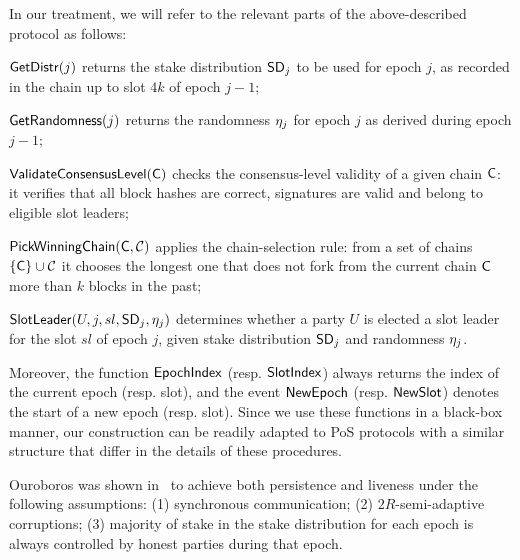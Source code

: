 In our treatment, we will refer to the relevant parts of the above-described protocol as
follows:
\begin{description}
\item
  $\mathsf{GetDistr}(j)$
  returns the stake distribution $\mathsf{SD}_j$ to be used for epoch $j$, as recorded in the
    chain up to slot $4k$ of epoch $j-1$;

\item
  $\mathsf{GetRandomness}(j)$
  returns the randomness $\eta_j$ for epoch $j$ as derived during epoch $j-1$;
\item
  $\mathsf{ValidateConsensusLevel}(\mathsf{C})$
  checks the consensus-level validity of a given chain $\mathsf{C}$: it verifies that all block hashes
    are correct, signatures are valid and belong to eligible slot leaders;
\item
  $\mathsf{PickWinningChain}(\mathsf{C},\mathcal{C})$
    applies the chain-selection rule: from a set of chains $\{\mathsf{C}\}\cup\mathcal{C}$ it
    chooses the longest one that does not fork from the current chain $\mathsf{C}$
    more than $k$ blocks in the past;
\item
  $\mathsf{SlotLeader}(U,j,sl,\mathsf{SD}_j,\eta_{j})$
  determines whether a party $U$ is elected a slot leader for the slot $sl$ of
    epoch $j$, given stake distribution $\mathsf{SD}_j$ and randomness $\eta_{j}$.
\end{description}
Moreover, the function $\mathsf{EpochIndex}$ (resp. $\mathsf{SlotIndex}$) always returns
the index of the current epoch (resp. slot), and the event $\mathsf{NewEpoch}$ (resp.
$\mathsf{NewSlot}$) denotes the start of a new epoch (resp. slot).
Since we use these functions in a black-box manner, our construction can be
readily adapted to PoS protocols with a similar structure that differ in the
details of these procedures.

Ouroboros was shown in~\cite{ouroboros} to achieve
both persistence and liveness
under the following assumptions:
(1) synchronous communication;
(2) $2R$-semi-adaptive corruptions;
(3) majority of stake in the stake distribution for each epoch is
always controlled by honest parties during that epoch.
